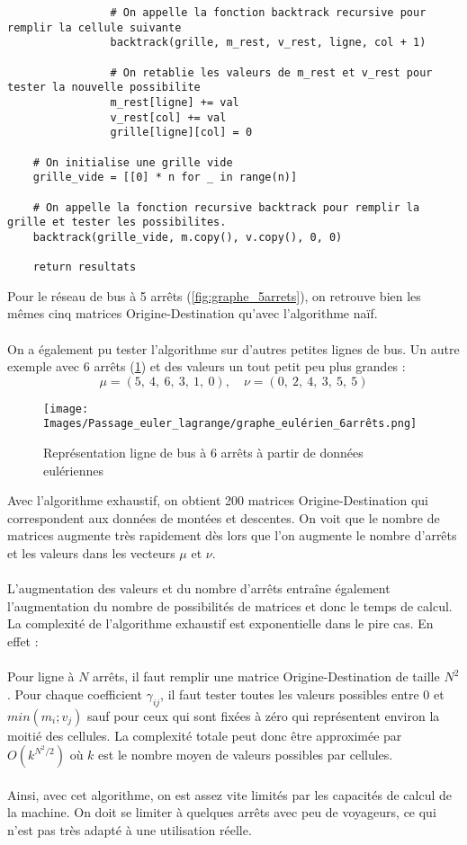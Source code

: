 \documentclass[12pt]{article}
\begin{document}
\begin{lstlisting}
                # On appelle la fonction backtrack recursive pour remplir la cellule suivante
                backtrack(grille, m_rest, v_rest, ligne, col + 1)

                # On retablie les valeurs de m_rest et v_rest pour tester la nouvelle possibilite
                m_rest[ligne] += val
                v_rest[col] += val
                grille[ligne][col] = 0

    # On initialise une grille vide
    grille_vide = [[0] * n for _ in range(n)]

    # On appelle la fonction recursive backtrack pour remplir la grille et tester les possibilites.
    backtrack(grille_vide, m.copy(), v.copy(), 0, 0)

    return resultats
\end{lstlisting}
Pour le réseau de bus à 5 arrêts (\ref{fig:graphe_5arrets}), on retrouve bien les mêmes cinq matrices Origine-Destination qu'avec l'algorithme naïf.\\
\\
On a également pu tester l'algorithme sur d'autres petites lignes de bus. Un autre exemple avec 6 arrêts (\ref{graphe_euler_6arrêts}) et des valeurs un tout petit peu plus grandes :\\
\[ 
\mu = (5,\:4,\:6,\:3,\:1,\:0), \quad \nu = (0,\: 2,\: 4, \:3,\: 5,\: 5)
\]
\begin{figure}[H]
    \centering
    \texttt{[image: Images/Passage\_euler\_lagrange/graphe\_eulérien\_6arrêts.png]}
    \caption{Représentation ligne de bus à 6 arrêts à partir de données eulériennes}
    \label{graphe_euler_6arrêts}
\end{figure}
Avec l'algorithme exhaustif, on obtient 200 matrices Origine-Destination qui correspondent aux données de montées et descentes. On voit que le nombre de matrices augmente très rapidement dès lors que l'on augmente le nombre d'arrêts et les valeurs dans les vecteurs $\mu$ et $\nu$.\\
\\
L'augmentation des valeurs et du nombre d'arrêts entraîne également l'augmentation du nombre de possibilités de matrices et donc le temps de calcul. La complexité de l'algorithme exhaustif est exponentielle dans le pire cas. En effet :\\
\\
Pour ligne à $N$ arrêts, il faut remplir une matrice Origine-Destination de taille $N^2$. Pour chaque coefficient $\gamma_{ij}$, il faut tester toutes les valeurs possibles entre 0 et $min(m_i;v_j)$ sauf pour ceux qui sont fixées à zéro qui représentent environ la moitié des cellules. La complexité totale peut donc être approximée par $O(k^{N^2/2})$ où $k$ est le nombre moyen de valeurs possibles par cellules.\\
\\
Ainsi, avec cet algorithme, on est assez vite limités par les capacités de calcul de la machine. On doit se limiter à quelques arrêts avec peu de voyageurs, ce qui n'est pas très adapté à une utilisation réelle.
\end{document}
